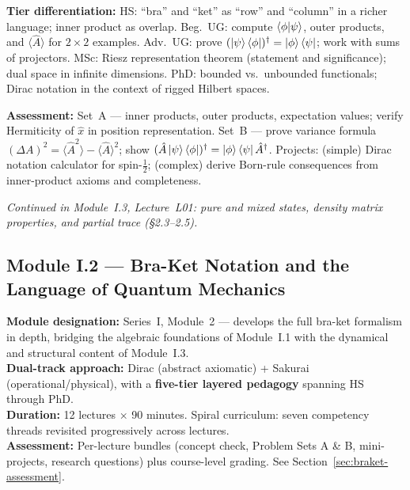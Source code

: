 \documentclass[11pt,a4paper]{article}
\newcommand{\coursebadge}[1]{%
  \begin{tcolorbox}[highlightbox]#1\end{tcolorbox}%
}
\begin{document}
\begin{tcolorbox}[modulebox, title={Module~I.1 --- Lecture L06: Bra-Ket Formalism (\S2.1--2.2)}]
\medskip\textbf{Tier differentiation:}
HS: ``bra'' and ``ket'' as ``row'' and ``column'' in a richer language; inner product as overlap.
Beg.\ UG: compute $\braket{\phi|\psi}$, outer products, and $\langle\hat{A}\rangle$ for $2\times 2$ examples.
Adv.\ UG: prove $(\ket{\psi}\bra{\phi})^\dagger = \ket{\phi}\bra{\psi}$; work with sums of projectors.
MSc: Riesz representation theorem (statement and significance); dual space in infinite dimensions.
PhD: bounded vs.\ unbounded functionals; Dirac notation in the context of rigged Hilbert spaces.

\medskip\textbf{Assessment:}
Set~A --- inner products, outer products, expectation values; verify Hermiticity of $\hat{x}$ in position representation.
Set~B --- prove variance formula $(\Delta A)^2 = \langle\hat{A}^2\rangle - \langle\hat{A}\rangle^2$;
show $(\hat{A}\ket{\psi}\bra{\phi})^\dagger = \ket{\phi}\bra{\psi}\hat{A}^\dagger$.
Projects: (simple) Dirac notation calculator for spin-$\tfrac{1}{2}$; (complex) derive Born-rule consequences
from inner-product axioms and completeness.
\end{tcolorbox}

\textit{Continued in Module~I.3, Lecture~L01: pure and mixed states,
density matrix properties, and partial trace (\S2.3--2.5).}

\newpage
\subsection{Module I.2 --- Bra-Ket Notation and the Language of Quantum Mechanics}
\label{sec:mod-I2}

\coursebadge{%
  \textbf{Module designation:} Series~I, Module~2 --- develops the full bra-ket
  formalism in depth, bridging the algebraic foundations of Module~I.1 with the
  dynamical and structural content of Module~I.3.\\[2pt]
  \textbf{Dual-track approach:} Dirac (abstract axiomatic) + Sakurai (operational/physical),
  with a \textbf{five-tier layered pedagogy} spanning HS through PhD.\\[2pt]
  \textbf{Duration:} 12 lectures $\times$ 90 minutes. Spiral curriculum: seven competency
  threads revisited progressively across lectures.\\[2pt]
  \textbf{Assessment:} Per-lecture bundles (concept check, Problem Sets A \& B, mini-projects,
  research questions) plus course-level grading. See Section~\ref{sec:braket-assessment}.
}
\end{document}
